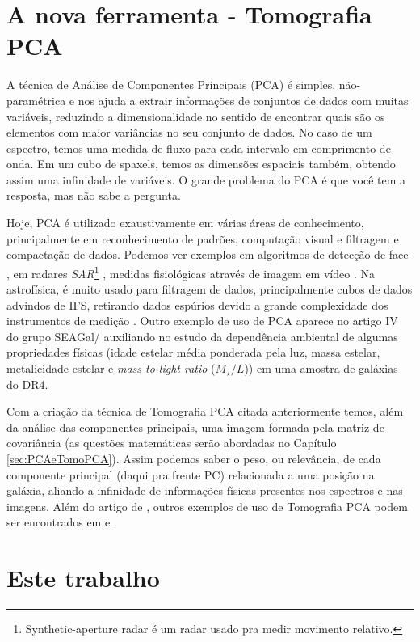 \section{A nova ferramenta - Tomografia PCA}
\label{sec:Intro:TomoPCA}

A técnica de Análise de Componentes Principais (PCA) é simples, não-paramétrica
e nos ajuda a extrair informações de conjuntos de dados com muitas variáveis,
reduzindo a dimensionalidade no sentido de encontrar quais são os elementos com
maior variâncias no seu conjunto de dados. No caso de um espectro, temos uma
medida de fluxo para cada intervalo em comprimento de onda. Em um cubo de
spaxels, temos as dimensões espaciais também, obtendo assim uma infinidade de
variáveis. O grande problema do PCA é que você tem a resposta, mas não sabe a
pergunta.

Hoje, PCA é utilizado exaustivamente em várias áreas de conhecimento,
principalmente em reconhecimento de padrões, computação visual e filtragem e
compactação de dados. Podemos ver exemplos em algoritmos de detecção de face
\citep{Kamruzzaman2010}, em radares {\em SAR}\footnote{Synthetic-aperture radar
é um radar usado pra medir movimento relativo.} \citep{Borcea2012}, medidas
fisiológicas através de imagem em vídeo \citep{Balakrishnan2013}. Na
astrofísica, é muito usado para filtragem de dados, principalmente cubos de
dados advindos de IFS, retirando dados espúrios devido a grande complexidade dos
instrumentos de medição \citep{Riffel2011} \fixme \citneed. Outro exemplo de uso
de PCA aparece no artigo IV do grupo SEAGal/\starlight \citep{Mateus2007}
auxiliando no estudo da dependência ambiental de algumas propriedades físicas
(idade estelar média ponderada pela luz, massa estelar, metalicidade estelar e
{\em mass-to-light ratio} ($M_\star / L$)) em uma amostra de galáxias
do \SDSS DR4.

Com a criação da técnica de Tomografia PCA citada anteriormente temos, além da
análise das componentes principais, uma imagem formada pela matriz de
covariância (as questões matemáticas serão abordadas no Capítulo
\ref{sec:PCAeTomoPCA}). Assim podemos saber o peso, ou relevância, de cada
componente principal (daqui pra frente PC) relacionada a uma posição na galáxia,
aliando a infinidade de informações físicas presentes nos espectros e nas
imagens. Além do artigo de \citet{Steiner2009}, outros exemplos de uso de
Tomografia PCA podem ser encontrados em \citet{Riffel2011} e \citet{Ricci2011}.

\section{Este trabalho}
\label{sec:Intro:ThisWork}

